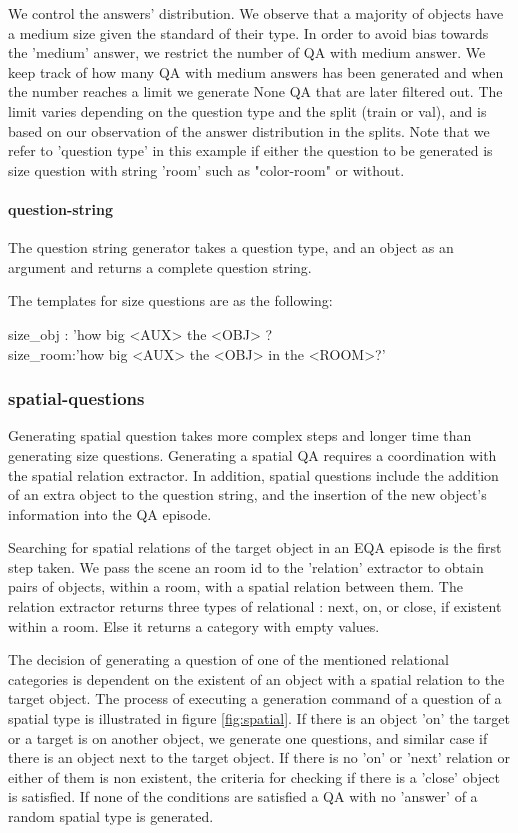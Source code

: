 We control the answers' distribution. We observe that a majority of objects have a medium size given the standard of their type. In order to avoid bias towards the 'medium' answer, we restrict the number of QA with medium answer. We keep track of how many QA with medium answers has been generated and when the number reaches a limit we generate None QA that are later filtered out. The limit varies depending on the question type and the split (train or val), and is based on our observation of the answer distribution in the splits. Note that we refer to 'question type' in this example if either the question to be generated is size question with string 'room' such as "color-room" or without. 


\paragraph{question-string}

The question string generator takes a question type, and an object as an argument and returns a complete question string. 

The templates for size questions are as the following: 

size\_obj : 'how big <AUX> the <OBJ> ? \\
size\_room:'how big <AUX>  the <OBJ> in the <ROOM>?'

\subsubsection{spatial-questions}

Generating spatial question takes more complex steps and longer time than generating size questions. Generating a spatial QA requires a coordination with the spatial relation extractor. In addition, spatial questions include the addition of an extra object to the question string, and the insertion of the new object's information into the QA episode. 

Searching for spatial relations of the target object in an EQA episode is the first step taken. We pass the scene an room id to the 'relation' extractor to obtain pairs of objects, within a room,  with a spatial relation between them. The relation extractor returns three types of relational : next, on, or close, if existent within a room. Else it returns a category with empty values. 

The decision of generating a question of one of the mentioned relational categories is dependent on the existent of an object with a spatial relation to the target object. The process of executing a generation command of a question of a spatial type is illustrated in figure \ref{fig:spatial}. If there is an object 'on' the target or a target is on another object, we generate one questions, and similar case if there is an object next to the target object. If there is no 'on' or 'next' relation or either of them is non existent, the criteria for checking if there is a 'close' object is satisfied. If none of the conditions are satisfied a QA with no 'answer' of a random spatial type is generated.   

